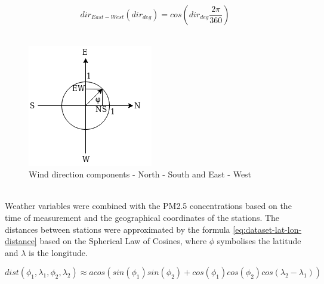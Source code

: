 \begin{equation} \label{eq:methodology-wind-dir-ew}
{dir}_{East-West}({dir}_{deg}) =  cos({dir}_{deg}\frac{2 \pi}{360})
\end{equation}
\\
\begin{figure}[htp]
    \centering
    \includegraphics[scale=1]{figures/dataset/wind_direction.png}
    \caption{Wind direction components - North - South and East - West}
    \label{fig:dataset-wind-direction-components}
\end{figure}\\
Weather variables were combined with the PM2.5 concentrations based on the time of measurement and the geographical coordinates of the stations. The distances between stations were approximated by the formula \ref{eq:dataset-lat-lon-distance} based on the Spherical Law of Cosines, where $\phi$ symbolises the latitude and $\lambda$ is the longitude.

\begin{equation} \label{eq:dataset-lat-lon-distance}
dist(\phi_1, \lambda_1, \phi_2, \lambda_2) \approx acos(sin(\phi_1) sin(\phi_2) + cos(\phi_1)cos(\phi_2)cos(\lambda_2 - \lambda_1))
\end{equation}

